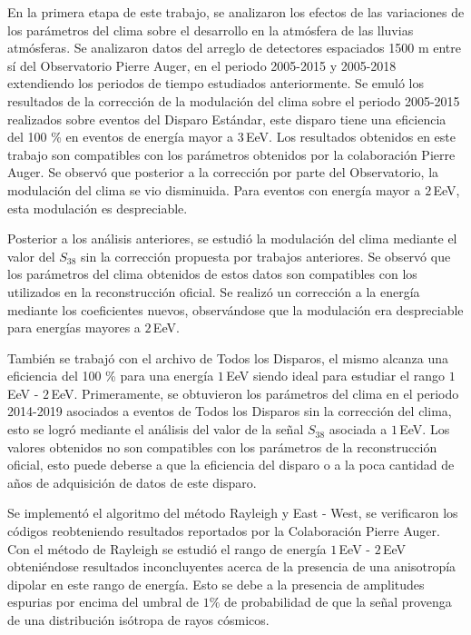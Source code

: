 
En la primera etapa de este trabajo, se analizaron los efectos de las variaciones de los parámetros del clima sobre el desarrollo en la atmósfera de las lluvias atmósferas. Se analizaron datos del arreglo de detectores espaciados 1500 m entre sí del Observatorio Pierre Auger, en el periodo 2005-2015 y 2005-2018 extendiendo los periodos de tiempo estudiados anteriormente. Se emuló los resultados de la corrección de la modulación del clima sobre el periodo 2005-2015 realizados sobre eventos del Disparo Estándar, este disparo tiene una eficiencia del 100 \% en eventos de energía mayor a $3\,$EeV. Los resultados obtenidos en este trabajo son compatibles con los parámetros obtenidos por la colaboración Pierre Auger. Se observó que posterior a la corrección por parte del Observatorio, la modulación del clima se vio disminuida. Para eventos con energía mayor a $2\,$EeV, esta modulación es despreciable.

Posterior a los análisis anteriores, se estudió la modulación del clima mediante el valor del $S_{38}$ sin la corrección propuesta por trabajos anteriores. Se observó que los parámetros del clima obtenidos de estos datos son compatibles con los utilizados en la reconstrucción oficial. Se realizó un corrección a la energía mediante los coeficientes nuevos, observándose que la modulación era despreciable para energías mayores a $2\,$EeV. 

También se trabajó con el archivo de Todos los Disparos, el mismo alcanza una eficiencia del 100 \% para una energía $1\,$EeV siendo ideal para estudiar el rango $1\,$EeV - $2\,$EeV. Primeramente, se obtuvieron los parámetros del clima en el periodo 2014-2019 asociados a eventos de Todos los Disparos sin la corrección del clima, esto se logró mediante el análisis del valor de la señal $S_{38}$ asociada a $1\,$EeV. Los valores obtenidos no son compatibles con los parámetros de la reconstrucción oficial, esto puede deberse a que la eficiencia del disparo o a la poca cantidad de años de adquisición de datos de este disparo.

Se implementó el algoritmo del método Rayleigh  y East - West, se verificaron los códigos reobteniendo resultados reportados por la Colaboración Pierre Auger. Con el método de Rayleigh se estudió el rango de energía $1\,$EeV - $2\,$EeV obteniéndose resultados inconcluyentes acerca de la presencia de una anisotropía dipolar en este rango de energía. Esto se debe a la presencia de amplitudes espurias por encima del umbral de $1\%$  de probabilidad de que la señal provenga de una distribución isótropa de rayos cósmicos.  

